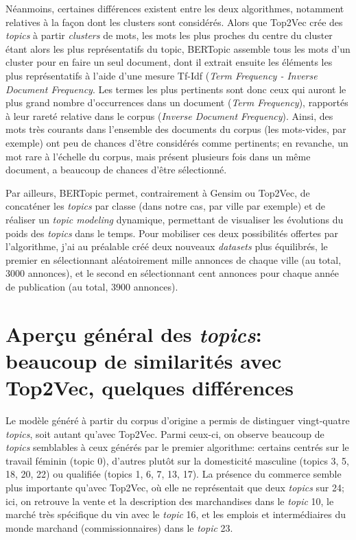 Néanmoins, certaines différences existent entre les deux algorithmes, notamment relatives à la façon dont les clusters sont considérés. Alors que Top2Vec crée des \textit{topics} à partir \textit{clusters} de mots, les mots les plus proches du centre du cluster étant alors les plus représentatifs du topic, BERTopic assemble tous les mots d'un cluster pour en faire un seul document, dont il extrait ensuite les éléments les plus représentatifs à l'aide d'une mesure Tf-Idf (\textit{Term Frequency - Inverse Document Frequency}. Les termes les plus pertinents sont donc ceux qui auront le plus grand nombre d'occurrences dans un document (\textit{Term Frequency}), rapportés à leur rareté relative dans le corpus (\textit{Inverse Document Frequency}). Ainsi, des mots très courants dans l'ensemble des documents du corpus (les mots-vides, par exemple) ont peu de chances d'être considérés comme pertinents; en revanche, un mot rare à l'échelle du corpus, mais présent plusieurs fois dans un même document, a beaucoup de chances d'être sélectionné. 

Par ailleurs, BERTopic permet, contrairement à Gensim ou Top2Vec, de concaténer les \textit{topics} par classe (dans notre cas, par ville par exemple) et de réaliser un \textit{topic modeling} dynamique, permettant de visualiser les évolutions du poids des \textit{topics} dans le temps. Pour mobiliser ces deux possibilités offertes par l'algorithme, j'ai au préalable créé deux nouveaux \textit{datasets} plus équilibrés, le premier en sélectionnant aléatoirement mille annonces de chaque ville (au total, 3000 annonces), et le second en sélectionnant cent annonces pour chaque année de publication (au total, 3900 annonces). 

\section{Aperçu général des \textit{topics}: beaucoup de similarités avec Top2Vec, quelques différences}


Le modèle généré à partir du corpus d'origine a permis de distinguer vingt-quatre \textit{topics}, soit autant qu'avec Top2Vec. Parmi ceux-ci, on observe beaucoup de \textit{topics} semblables à ceux générés par le premier algorithme: certains centrés sur le travail féminin (topic 0), d'autres plutôt sur la domesticité masculine (topics 3, 5, 18, 20, 22) ou qualifiée (topics 1, 6, 7, 13, 17). La présence du commerce semble plus importante qu'avec Top2Vec, où elle ne représentait que deux \textit{topics} sur 24; ici, on retrouve la vente et la description des marchandises dans le \textit{topic} 10, le marché très spécifique du vin avec le \textit{topic} 16, et les emplois et intermédiaires du monde marchand (commissionnaires) dans le \textit{topic} 23. 

